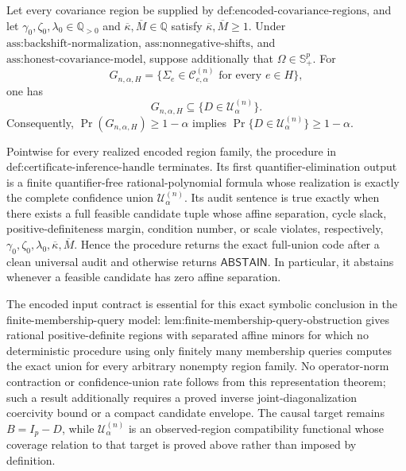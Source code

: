 Let every covariance region be supplied by \(\text{def:encoded-covariance-regions}\), and let \(\gamma_0,\zeta_0,\lambda_0\in\mathbb Q_{>0}\) and \(\overline\kappa,\overline M\in\mathbb Q\) satisfy \(\overline\kappa,\overline M\geq1\). Under \(\text{ass:backshift-normalization}\), \(\text{ass:nonnegative-shifts}\), and \(\text{ass:honest-covariance-model}\), suppose additionally that \(\Omega\in\mathbb S_+^p\). For
\[
G_{n,\alpha,H}=\{\Sigma_e\in\mathcal C^{(n)}_{e,\alpha}\text{ for every }e\in H\},
\]
one has
\[
G_{n,\alpha,H}\subseteq\{D\in\mathcal U^{(n)}_\alpha\}.
\]
Consequently, \(\Pr(G_{n,\alpha,H})\geq1-\alpha\) implies \(\Pr\{D\in\mathcal U^{(n)}_\alpha\}\geq1-\alpha\).

Pointwise for every realized encoded region family, the procedure in \(\text{def:certificate-inference-handle}\) terminates. Its first quantifier-elimination output is a finite quantifier-free rational-polynomial formula whose realization is exactly the complete confidence union \(\mathcal U^{(n)}_\alpha\). Its audit sentence is true exactly when there exists a full feasible candidate tuple whose affine separation, cycle slack, positive-definiteness margin, condition number, or scale violates, respectively, \(\gamma_0,\zeta_0,\lambda_0,\overline\kappa,\overline M\). Hence the procedure returns the exact full-union code after a clean universal audit and otherwise returns \(\mathsf{ABSTAIN}\). In particular, it abstains whenever a feasible candidate has zero affine separation.

The encoded input contract is essential for this exact symbolic conclusion in the finite-membership-query model: \(\text{lem:finite-membership-query-obstruction}\) gives rational positive-definite regions with separated affine minors for which no deterministic procedure using only finitely many membership queries computes the exact union for every arbitrary nonempty region family. No operator-norm contraction or confidence-union rate follows from this representation theorem; such a result additionally requires a proved inverse joint-diagonalization coercivity bound or a compact candidate envelope. The causal target remains \(B=I_p-D\), while \(\mathcal U^{(n)}_\alpha\) is an observed-region compatibility functional whose coverage relation to that target is proved above rather than imposed by definition.